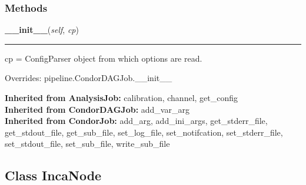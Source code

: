   \subsubsection{Methods}

    \label{inspiral:IncaJob:__init__}
    \vspace{0.5ex}

    \noindent\begin{boxedminipage}{\textwidth}

    \raggedright \textbf{\_\_init\_\_}(\textit{self}, \textit{cp})

    \vspace{-1.5ex}

    \rule{\textwidth}{0.5\fboxrule}
    cp = ConfigParser object from which options are read.

    \vspace{1ex}

      Overrides: pipeline.CondorDAGJob.\_\_init\_\_

    \end{boxedminipage}

  \textbf{Inherited from AnalysisJob:}
    calibration,
    channel,
    get\_config
    \\
  \textbf{Inherited from CondorDAGJob:}
    add\_var\_arg
    \\
  \textbf{Inherited from CondorJob:}
    add\_arg,
    add\_ini\_args,
    get\_stderr\_file,
    get\_stdout\_file,
    get\_sub\_file,
    set\_log\_file,
    set\_notifcation,
    set\_stderr\_file,
    set\_stdout\_file,
    set\_sub\_file,
    write\_sub\_file


\subsection{Class IncaNode}

